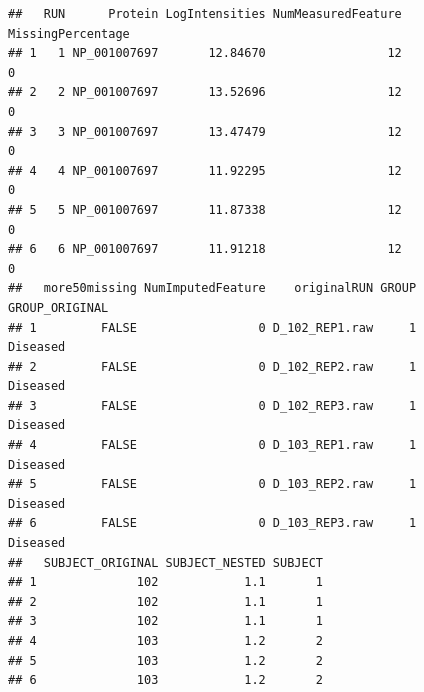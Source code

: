 \documentclass[]{book}
\newenvironment{Shaded}{\begin{snugshade}}{\end{snugshade}}
\newcommand{\CommentTok}[1]{\textcolor[rgb]{0.56,0.35,0.01}{\textit{#1}}}
\newcommand{\KeywordTok}[1]{\textcolor[rgb]{0.13,0.29,0.53}{\textbf{#1}}}
\newcommand{\NormalTok}[1]{#1}
\newcommand{\OperatorTok}[1]{\textcolor[rgb]{0.81,0.36,0.00}{\textbf{#1}}}
\begin{document}
\begin{Shaded}
\end{Shaded}

\begin{verbatim}
##   RUN      Protein LogIntensities NumMeasuredFeature MissingPercentage
## 1   1 NP_001007697       12.84670                 12                 0
## 2   2 NP_001007697       13.52696                 12                 0
## 3   3 NP_001007697       13.47479                 12                 0
## 4   4 NP_001007697       11.92295                 12                 0
## 5   5 NP_001007697       11.87338                 12                 0
## 6   6 NP_001007697       11.91218                 12                 0
##   more50missing NumImputedFeature    originalRUN GROUP GROUP_ORIGINAL
## 1         FALSE                 0 D_102_REP1.raw     1       Diseased
## 2         FALSE                 0 D_102_REP2.raw     1       Diseased
## 3         FALSE                 0 D_102_REP3.raw     1       Diseased
## 4         FALSE                 0 D_103_REP1.raw     1       Diseased
## 5         FALSE                 0 D_103_REP2.raw     1       Diseased
## 6         FALSE                 0 D_103_REP3.raw     1       Diseased
##   SUBJECT_ORIGINAL SUBJECT_NESTED SUBJECT
## 1              102            1.1       1
## 2              102            1.1       1
## 3              102            1.1       1
## 4              103            1.2       2
## 5              103            1.2       2
## 6              103            1.2       2
\end{verbatim}

\begin{Shaded}
\end{Shaded}
\end{document}
